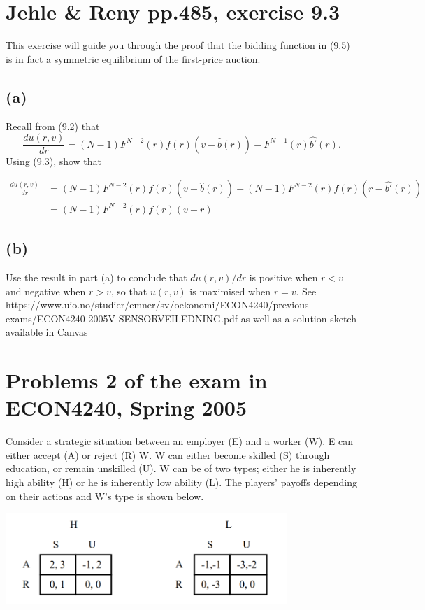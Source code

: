 \documentclass{article}
\begin{document}
\bigskip

\section{Jehle \& Reny pp.485, exercise 9.3}

This exercise will guide you through the proof that the bidding function in (9.5) is in fact a symmetric
equilibrium of the first-price auction.

\subsection*{(a)} Recall from (9.2) that
$$\frac{du(r,v)}{dr}=(N-1)F^{N-2}(r)f(r)(v-\hat{b}(r))-F^{N-1}(r)\hat{b'}(r).$$
Using (9.3), show that


\begin{align*}
\frac{du(r,v)}{dr}&=(N-1)F^{N-2}(r)f(r)(v-\hat{b}(r))-(N-1)F^{N-2}(r)f(r)(r-\hat{b'}(r)) \\
&= (N-1)F^{N-2}(r)f(r)(v-r)
\end{align*}

\subsection*{(b)}Use the result in part (a) to conclude that $du(r, v)/dr$ is positive when $r < v$ and negative when
$r > v$, so that $u(r, v)$ is maximised when $r = v$.
\bigskip
See https://www.uio.no/studier/emner/sv/oekonomi/ECON4240/previous-exams/ECON4240-2005V-SENSORVEILEDNING.pdf as well as a solution sketch available in Canvas

\section{Problems 2  of the exam in ECON4240, Spring 2005}


Consider a strategic situation between an employer (E) and a worker (W). E can either accept
(A) or reject (R) W. W can either become skilled (S) through education, or remain unskilled
(U). W can be of two types; either he is inherently high ability (H) or he is inherently low
ability (L). The players' payoffs depending on their actions and W's type is shown below.

{\centering
\includegraphics[width=0.8\textwidth]{12.q2}
\vspace{2mm}}
\end{document}
